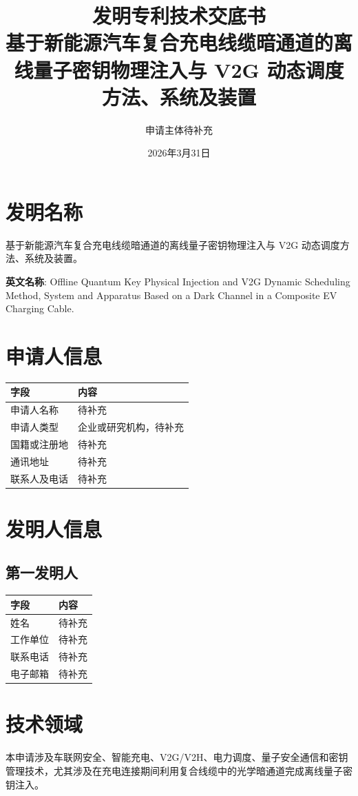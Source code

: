 ﻿\documentclass[12pt,a4paper]{article}
\title{\textbf{发明专利技术交底书}\\[0.5em]\Large 基于新能源汽车复合充电线缆暗通道的离线量子密钥物理注入与 V2G 动态调度方法、系统及装置}
\author{申请主体待补充}
\date{2026年3月31日}
\begin{document}
\maketitle
\tableofcontents
\newpage
\section{发明名称}
基于新能源汽车复合充电线缆暗通道的离线量子密钥物理注入与 V2G 动态调度方法、系统及装置。

\textbf{英文名称}: Offline Quantum Key Physical Injection and V2G Dynamic Scheduling Method, System and Apparatus Based on a Dark Channel in a Composite EV Charging Cable.

\section{申请人信息}
\begin{tabular}{|p{4cm}|p{8cm}|}
\hline
字段 & 内容 \\
\hline
申请人名称 & 待补充 \\
\hline
申请人类型 & 企业或研究机构，待补充 \\
\hline
国籍或注册地 & 待补充 \\
\hline
通讯地址 & 待补充 \\
\hline
联系人及电话 & 待补充 \\
\hline
\end{tabular}

\section{发明人信息}
\subsection{第一发明人}
\begin{tabular}{|p{4cm}|p{8cm}|}
\hline
字段 & 内容 \\
\hline
姓名 & 待补充 \\
\hline
工作单位 & 待补充 \\
\hline
联系电话 & 待补充 \\
\hline
电子邮箱 & 待补充 \\
\hline
\end{tabular}

\section{技术领域}
本申请涉及车联网安全、智能充电、V2G/V2H、电力调度、量子安全通信和密钥管理技术，尤其涉及在充电连接期间利用复合线缆中的光学暗通道完成离线量子密钥注入。
\end{document}
